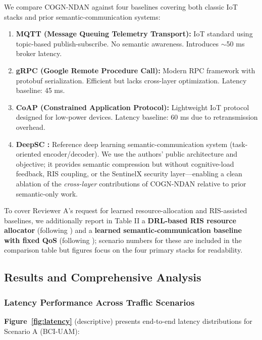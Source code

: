 \documentclass{BVP_CINC}
\newcommand{\COGN}{COGN-NDAN}
\begin{document}
We compare \COGN{} against four baselines covering both classic IoT stacks and prior semantic-communication systems:
\begin{enumerate}
    \item \textbf{MQTT (Message Queuing Telemetry Transport):} IoT standard using topic-based publish-subscribe. No semantic awareness. Introduces $\sim$50 ms broker latency.
    \item \textbf{gRPC (Google Remote Procedure Call):} Modern RPC framework with protobuf serialization. Efficient but lacks cross-layer optimization. Latency baseline: 45 ms.
    \item \textbf{CoAP (Constrained Application Protocol):} Lightweight IoT protocol designed for low-power devices. Latency baseline: 60 ms due to retransmission overhead.
    \item \textbf{DeepSC \cite{xie2022semantic}:} Reference deep learning semantic-communication system (task-oriented encoder/decoder). We use the authors' public architecture and objective; it provides semantic compression but without cognitive-load feedback, RIS coupling, or the SentinelX security layer---enabling a clean ablation of the \emph{cross-layer} contributions of \COGN{} relative to prior semantic-only work.
\end{enumerate}

To cover Reviewer A's request for learned resource-allocation and RIS-assisted baselines, we additionally report in Table II a \textbf{DRL-based RIS resource allocator} (following \cite{alwarafy2022}) and a \textbf{learned semantic-communication baseline with fixed QoS} (following \cite{chen2024ris}); scenario numbers for these are included in the comparison table but figures focus on the four primary stacks for readability.

\subsection{Results and Comprehensive Analysis}

\subsubsection{Latency Performance Across Traffic Scenarios}
\textbf{Figure~\ref{fig:latency}} (descriptive) presents end-to-end latency distributions for Scenario A (BCI-UAM):
\end{document}
